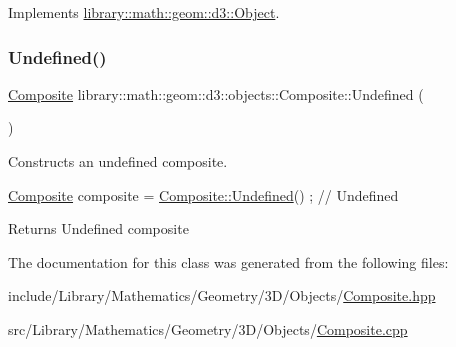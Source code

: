Implements \hyperlink{classlibrary_1_1math_1_1geom_1_1d3_1_1_object_aa166f4ce4d116a248f0fc861c75012ca}{library\+::math\+::geom\+::d3\+::\+Object}.

\mbox{\label{classlibrary_1_1math_1_1geom_1_1d3_1_1objects_1_1_composite_a333ecb6ef3b6569330272d51eec83a01}} 
\subsubsection{\texorpdfstring{Undefined()}{Undefined()}}
{\footnotesize\ttfamily \hyperlink{classlibrary_1_1math_1_1geom_1_1d3_1_1objects_1_1_composite}{Composite} library\+::math\+::geom\+::d3\+::objects\+::\+Composite\+::\+Undefined (\begin{DoxyParamCaption}{ }\end{DoxyParamCaption})\hspace{0.3cm}{\ttfamily [static]}}



Constructs an undefined composite. 


\begin{DoxyCode}
\hyperlink{classlibrary_1_1math_1_1geom_1_1d3_1_1objects_1_1_composite_a65acc162c125c6ad463b26f21cb87c39}{Composite} composite = \hyperlink{classlibrary_1_1math_1_1geom_1_1d3_1_1objects_1_1_composite_a333ecb6ef3b6569330272d51eec83a01}{Composite::Undefined}() ; \textcolor{comment}{// Undefined}
\end{DoxyCode}


\begin{DoxyReturn}{Returns}
Undefined composite 
\end{DoxyReturn}


The documentation for this class was generated from the following files\+:\begin{DoxyCompactItemize}
\item 
include/\+Library/\+Mathematics/\+Geometry/3\+D/\+Objects/\hyperlink{_composite_8hpp}{Composite.\+hpp}\item 
src/\+Library/\+Mathematics/\+Geometry/3\+D/\+Objects/\hyperlink{_composite_8cpp}{Composite.\+cpp}\end{DoxyCompactItemize}
